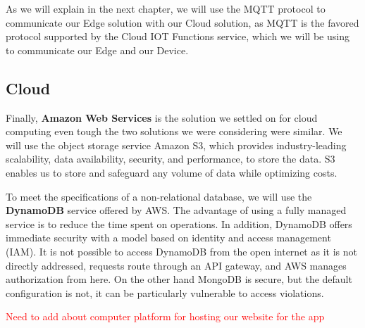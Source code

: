 As we will explain in the next chapter, we will use the MQTT protocol to communicate our Edge solution with our Cloud solution, as MQTT is the favored protocol supported by the Cloud IOT Functions service, which we will be using to communicate our Edge and our Device.

\subsection{Cloud}
Finally, \textbf{Amazon Web Services} is the solution we settled on for cloud computing even tough the two solutions we were considering were similar. We will use the object storage service Amazon S3, which provides industry-leading scalability, data availability, security, and performance, to store the data. S3 enables us to store and safeguard any volume of data while optimizing costs. 

To meet the specifications of a non-relational database, we will use the \textbf{DynamoDB} service offered by AWS. The advantage of using a fully managed service is to reduce the time spent on operations.
In addition, DynamoDB offers immediate security with a model based on identity and access management (IAM). It is not possible to access DynamoDB from the open internet as it is not directly addressed, requests route through an API gateway, and AWS manages authorization from here.
On the other hand MongoDB is secure, but the default configuration is not, it can be particularly vulnerable to access violations. 

\textcolor{red}{Need to add about computer platform for hosting our website for the app}